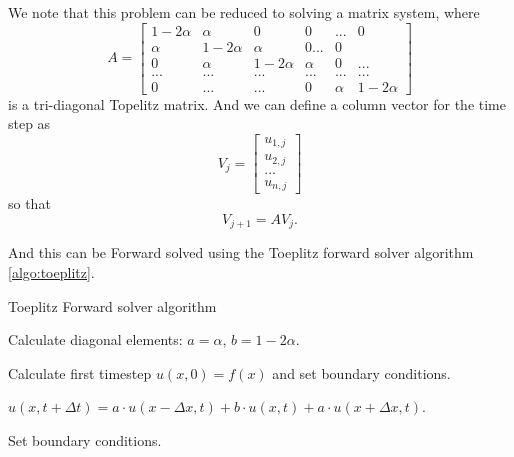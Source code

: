 We note that this problem can be reduced to solving a matrix system, where
$$
    A=
    \begin{bmatrix}
        1-2\alpha & \alpha & 0 & 0 & ... & 0 \\
        \alpha    & 1-2\alpha & \alpha & 0 ... & 0 \\
        0 & \alpha & 1-2\alpha & \alpha & 0 & ... \\
        ... & ... & ... & ... & ... & ... \\
        0 & ... & ... & 0 & \alpha & 1-2\alpha
    \end{bmatrix}
$$
is a tri-diagonal Topelitz matrix. And we can define a column vector for the
time step as
$$
    V_j = 
    \begin{bmatrix}
        u_{1,j}\\
        u_{2,j}\\
        ...\\
        u_{n,j}
    \end{bmatrix}
$$
so that
\begin{equation}
    V_{j+1} = AV_j.
\end{equation}

And this can be Forward solved using the Toeplitz forward solver algorithm \ref{algo:toeplitz}.

\begin{algorithm}
    \caption{Toeplitz Forward solver algorithm}\label{algo:toeplitz}
    \begin{algorithmic}
        
        
        
        
        Calculate diagonal elements: $a=\alpha$, $b=1-2\alpha$.
    
        Calculate first timestep $u(x,0)=f(x)$ and set boundary conditions.
    
            
            $u(x, t+\Delta t) = a \cdot u(x-\Delta x, t) + b\cdot u(x,
            t) + a \cdot u(x+\Delta x, t)$.
    
            Set boundary conditions.
        \EndWhile
    
    \end{algorithmic}
    \end{algorithm}
    
